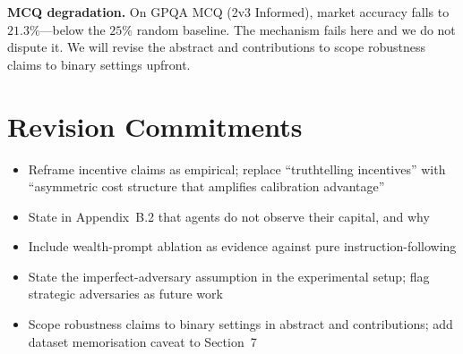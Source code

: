 \documentclass[10pt]{article}
\begin{document}
\textbf{MCQ degradation.}
On GPQA MCQ (2v3 Informed), market accuracy falls to $21.3\%$---below the $25\%$
random baseline. The mechanism fails here and we do not dispute it. We will
revise the abstract and contributions to scope robustness claims to binary
settings upfront.

\section*{Revision Commitments}

\begin{itemize}[noitemsep,topsep=2pt,leftmargin=*]
  \item Reframe incentive claims as empirical; replace ``truthtelling incentives''
        with ``asymmetric cost structure that amplifies calibration advantage''
  \item State in Appendix~B.2 that agents do not observe their capital, and why
  \item Include wealth-prompt ablation as evidence against pure instruction-following
  \item State the imperfect-adversary assumption in the experimental setup;
        flag strategic adversaries as future work
  \item Scope robustness claims to binary settings in abstract and contributions;
        add dataset memorisation caveat to Section~7
\end{itemize}
\end{document}
